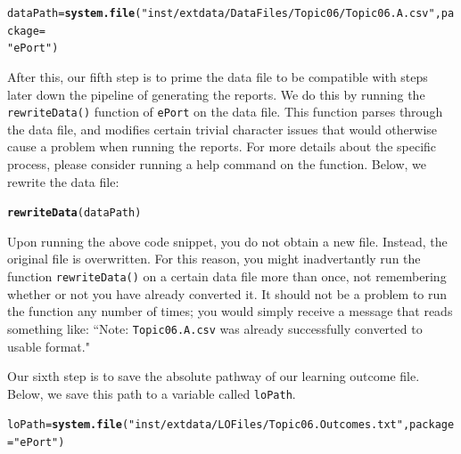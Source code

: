 \documentclass{article}\usepackage[]{graphicx}\usepackage[]{color}
\makeatletter
\newcommand{\hlstr}[1]{\textcolor[rgb]{0.192,0.494,0.8}{#1}}%
\newcommand{\hlstd}[1]{\textcolor[rgb]{0.345,0.345,0.345}{#1}}%
\newcommand{\hlkwb}[1]{\textcolor[rgb]{0.69,0.353,0.396}{#1}}%
\newcommand{\hlkwc}[1]{\textcolor[rgb]{0.333,0.667,0.333}{#1}}%
\newcommand{\hlkwd}[1]{\textcolor[rgb]{0.737,0.353,0.396}{\textbf{#1}}}%
\newenvironment{kframe}{%
 \def\at@end@of@kframe{}%
 \ifinner\ifhmode%
  \def\at@end@of@kframe{\end{minipage}}%
  \begin{minipage}{\columnwidth}%
 \fi\fi%
 \def\FrameCommand##1{\hskip\@totalleftmargin \hskip-\fboxsep
 \colorbox{shadecolor}{##1}\hskip-\fboxsep
     \hskip-\linewidth \hskip-\@totalleftmargin \hskip\columnwidth}%
 \MakeFramed {\advance\hsize-\width
   \@totalleftmargin\z@ \linewidth\hsize
   \@setminipage}}%
 {\par\unskip\endMakeFramed%
 \at@end@of@kframe}
\newenvironment{knitrout}{}{} %
\numberwithin{equation}{section} %
\makeatother
\begin{document}
\begin{knitrout}
\color{fgcolor}\begin{kframe}
\begin{alltt}
\hlstd{dataPath} \hlkwb{=} \hlkwd{system.file}\hlstd{(}\hlstr{"inst/extdata/DataFiles/Topic06/Topic06.A.csv"}\hlstd{,} \hlkwc{package} \hlstd{=}
  \hlstr{"ePort"}\hlstd{)}
\end{alltt}
\end{kframe}
\end{knitrout}

After this, our fifth step is to prime the data file to be compatible with steps later down the pipeline of generating the reports. We do this by running the \texttt{rewriteData()} function of \texttt{ePort} on the data file. This function parses through the data file, and modifies certain trivial character issues that would otherwise cause a problem when running the reports. For more details about the specific process, please consider running a help command on the function. Below, we rewrite the data file: \\

\begin{knitrout}
\color{fgcolor}\begin{kframe}
\begin{alltt}
\hlkwd{rewriteData}\hlstd{(dataPath)}
\end{alltt}
\end{kframe}
\end{knitrout}

Upon running the above code snippet, you do not obtain a new file. Instead, the original file is overwritten. For this reason, you might inadvertantly run the function \texttt{rewriteData()} on a certain data file more than once, not remembering whether or not you have already converted it. It should not be a problem to run the function any number of times; you would simply receive a message that reads something like: ``Note: \texttt{Topic06.A.csv} was already successfully converted to usable format."

Our sixth step is to save the absolute pathway of our learning outcome file. Below, we save this path to a variable called \texttt{loPath}. \\

\begin{knitrout}
\color{fgcolor}\begin{kframe}
\begin{alltt}
\hlstd{loPath} \hlkwb{=} \hlkwd{system.file}\hlstd{(}\hlstr{"inst/extdata/LOFiles/Topic06.Outcomes.txt"}\hlstd{,} \hlkwc{package} \hlstd{=} \hlstr{"ePort"}\hlstd{)}
\end{alltt}
\end{kframe}
\end{knitrout}
\end{document}
